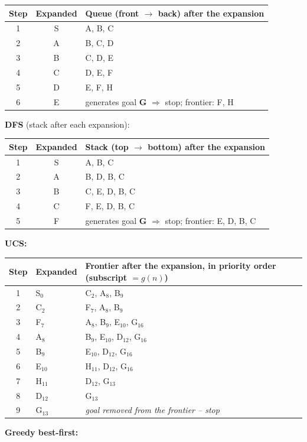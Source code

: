 \documentclass[11pt,a4paper]{article}
\begin{document}
\begin{solbox}
\begin{center}
\begin{tabularx}{\linewidth}{c c >{\raggedright\arraybackslash}X}
Step & Expanded & Queue (front $\rightarrow$ back) after the expansion \\ \midrule
1 & S & A, B, C \\
2 & A & B, C, D \\
3 & B & C, D, E \\
4 & C & D, E, F \\
5 & D & E, F, H \\
6 & E & generates goal \textbf{G} $\Rightarrow$ stop; frontier: F, H \\
\bottomrule\end{tabularx}\end{center}\textbf{DFS} (stack after each expansion):\begin{center}\small\begin{tabularx}{\linewidth}{c c >{\raggedright\arraybackslash}X}\toprule
Step & Expanded & Stack (top $\rightarrow$ bottom) after the expansion \\ \midrule
1 & S & A, B, C \\
2 & A & B, D, B, C \\
3 & B & C, E, D, B, C \\
4 & C & F, E, D, B, C \\
5 & F & generates goal \textbf{G} $\Rightarrow$ stop; frontier: E, D, B, C \\
\bottomrule\end{tabularx}\end{center}\textbf{UCS:}\begin{center}\small\begin{tabularx}{\linewidth}{c l >{\raggedright\arraybackslash}X}\toprule
Step & Expanded & Frontier after the expansion, in priority order (subscript $=g(n)$) \\ \midrule
1 & S$_{0}$ & C$_{2}$, A$_{8}$, B$_{9}$ \\
2 & C$_{2}$ & F$_{7}$, A$_{8}$, B$_{9}$ \\
3 & F$_{7}$ & A$_{8}$, B$_{9}$, E$_{10}$, G$_{16}$ \\
4 & A$_{8}$ & B$_{9}$, E$_{10}$, D$_{12}$, G$_{16}$ \\
5 & B$_{9}$ & E$_{10}$, D$_{12}$, G$_{16}$ \\
6 & E$_{10}$ & H$_{11}$, D$_{12}$, G$_{16}$ \\
7 & H$_{11}$ & D$_{12}$, G$_{13}$ \\
8 & D$_{12}$ & G$_{13}$ \\
9 & G$_{13}$ & \textit{goal removed from the frontier -- stop} \\
\bottomrule\end{tabularx}\end{center}\textbf{Greedy best-first:}\begin{center}\small\begin{tabularx}{\linewidth}{c l >{\raggedright\arraybackslash}X}\toprule

\end{tabularx}
\end{center}
\end{solbox}
\end{document}
